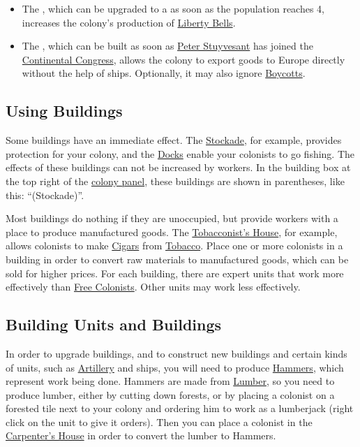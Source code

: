 \documentclass[12pt]{article}
\begin{document}
\begin{itemize}
\item The , which can be upgraded to a
   as soon as the population reaches 4, increases
  the colony's production of \hyperlink{Liberty Bells}{Liberty Bells}.

\item The , which can
  be built as soon as \hyperlink{Peter Stuyvesant}{Peter Stuyvesant}
  has joined the \hyperlink{Continental Congress}{Continental
  Congress}, allows the colony to export goods to Europe directly
  without the help of ships. Optionally, it may also ignore
  \hyperlink{Boycotts}{Boycotts}.

\end{itemize}


\hypertarget{Using Buildings}{\subsection{{Using Buildings}}}

Some buildings have an immediate effect. The
\hyperlink{Stockade}{Stockade}, for example, provides protection for
your colony, and the \hyperlink{Dock}{Docks} enable your colonists to
go fishing. The effects of these buildings can not be increased by
workers. In the building box at the top right of the \hyperlink{colony
panel}{colony panel}, these buildings are shown in parentheses, like
this: ``(Stockade)''.

Most buildings do nothing if they are unoccupied, but provide workers
with a place to produce manufactured goods. The
\hyperlink{Tobacconist's House}{Tobacconist's House}, for example,
allows colonists to make \hyperlink{Cigars}{Cigars} from
\hyperlink{Tobacco}{Tobacco}. Place one or more colonists in a
building in order to convert raw materials to manufactured goods,
which can be sold for higher prices. For each building, there are
expert units that work more effectively than \hyperlink{Free
  Colonist}{Free Colonists}. Other units may work less effectively.


\hypertarget{Building Units and Buildings}{\subsection{Building Units 
and Buildings}}

In order to upgrade buildings, and to construct new buildings and
certain kinds of units, such as \hyperlink{Artillery}{Artillery} and
ships, you will need to produce \hyperlink{Hammers}{Hammers}, which
represent work being done. Hammers are made from
\hyperlink{Lumber}{Lumber}, so you need to produce lumber, either by
cutting down forests, or by placing a colonist on a forested tile next
to your colony and ordering him to work as a lumberjack (right click
on the unit to give it orders). Then you can place a colonist in the
\hyperlink{Carpenter's House}{Carpenter's House} in order to convert
the lumber to Hammers.
\end{document}

